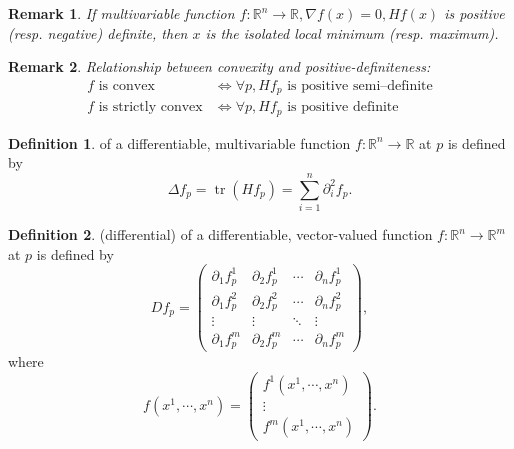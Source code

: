 \documentclass[a4paper]{article}
\theoremstyle{definition}
\newtheorem{definition}{Definition}
\theoremstyle{plain}
\newtheorem{remark}{Remark}
\begin{document}
\begin{remark}
    If multivariable function $f:\mathbb{R}^n\rightarrow\mathbb{R}, \nabla f(x)=0, Hf(x)$ is positive (resp. negative) definite, then $x$ is the isolated local minimum (resp. maximum).
\end{remark}

\begin{remark}
Relationship between convexity and positive-definiteness:
\begin{align*}
    f \text{ is convex}&\Leftrightarrow \forall p, Hf_p\text{ is positive semi–definite}\\
    f \text{ is strictly convex}&\Leftrightarrow \forall p, Hf_p\text{ is positive definite}
\end{align*}
\end{remark}

\begin{definition}
 of a differentiable, multivariable function $f:\mathbb{R}^n\rightarrow\mathbb{R}$ at $p$ is defined by
\begin{equation*}
    \Delta f_p=\operatorname{tr}(Hf_p)=\sum^n_{i=1}\partial^2_if_p.
\end{equation*}
\end{definition}

\begin{definition}
(differential) of a differentiable, vector-valued function $f:\mathbb{R}^n\rightarrow\mathbb{R}^m$ at $p$ is defined by \cite{stanford}
\begin{equation*}
    Df_p=
    \begin{pmatrix}
    \partial_1f^1_p & \partial_2f^1_p & \cdots & \partial_nf^1_p\\
    \partial_1f^2_p & \partial_2f^2_p & \cdots & \partial_nf^2_p\\
    \vdots & \vdots & \ddots & \vdots\\
    \partial_1f^m_p & \partial_2f^m_p & \cdots & \partial_nf^m_p
    \end{pmatrix},
\end{equation*}
where
\begin{equation*}
    f(x^1,\cdots,x^n)=\begin{pmatrix}
    f^1(x^1,\cdots,x^n)\\
    \vdots\\
    f^m(x^1,\cdots,x^n)
    \end{pmatrix}.
\end{equation*}
\end{definition}
\end{document}
